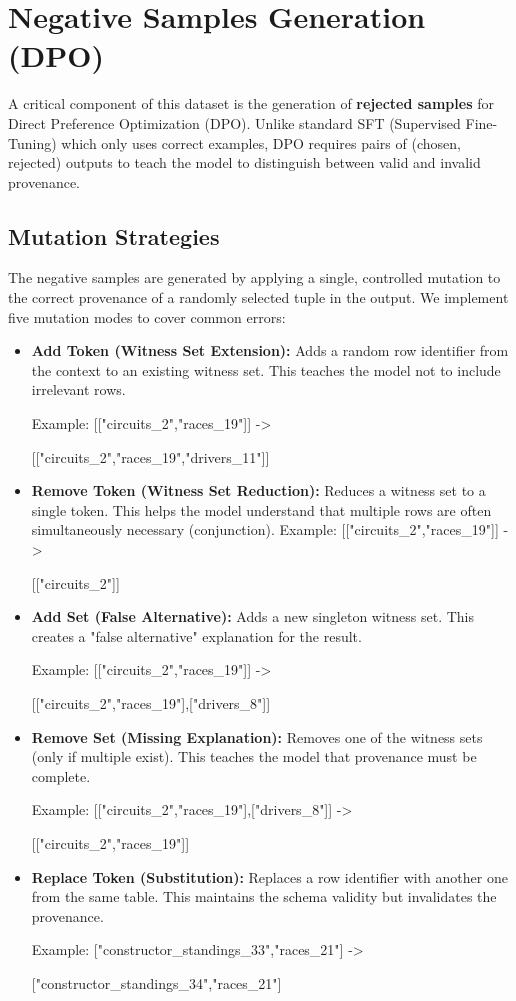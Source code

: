 \documentclass{article}
\begin{document}
\section{Negative Samples Generation (DPO)}
A critical component of this dataset is the generation of \textbf{rejected samples} for Direct Preference Optimization (DPO). Unlike standard SFT (Supervised Fine-Tuning) which only uses correct examples, DPO requires pairs of (chosen, rejected) outputs to teach the model to distinguish between valid and invalid provenance.

\subsection{Mutation Strategies}
The negative samples are generated by applying a single, controlled mutation to the correct provenance of a randomly selected tuple in the output. We implement five mutation modes to cover common errors:

\begin{itemize}
    \item \textbf{Add Token (Witness Set Extension):} Adds a random row identifier from the context to an existing witness set. This teaches the model not to include irrelevant rows.
    
    Example: [["circuits\_2","races\_19"]] -> 
    
    [["circuits\_2","races\_19","drivers\_11"]]
    \item \textbf{Remove Token (Witness Set Reduction):} Reduces a witness set to a single token. This helps the model understand that multiple rows are often simultaneously necessary (conjunction).
    Example: [["circuits\_2","races\_19"]] -> 
    
    [["circuits\_2"]]
    \item \textbf{Add Set (False Alternative):} Adds a new singleton witness set. This creates a "false alternative" explanation for the result.
    
    Example: [["circuits\_2","races\_19"]] -> 
    
    [["circuits\_2","races\_19"],["drivers\_8"]]
    \item \textbf{Remove Set (Missing Explanation):} Removes one of the witness sets (only if multiple exist). This teaches the model that provenance must be complete.
    
    Example: [["circuits\_2","races\_19"],["drivers\_8"]] -> 
    
    [["circuits\_2","races\_19"]]
    \item \textbf{Replace Token (Substitution):} Replaces a row identifier with another one from the same table. This maintains the schema validity but invalidates the provenance.
    
     Example: ["constructor\_standings\_33","races\_21"] -> 
     
     ["constructor\_standings\_34","races\_21"]
\end{itemize}
\end{document}
